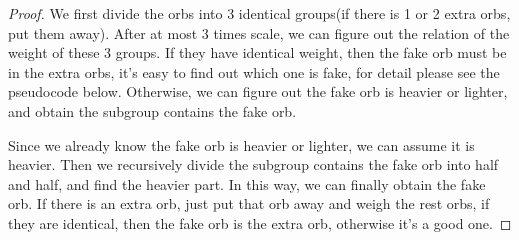 \documentclass[paper=a4, fontsize=11pt]{scrartcl} %
\numberwithin{equation}{section} %
\numberwithin{figure}{section} %
\numberwithin{table}{section} %
\newenvironment{myproof}{\begin{proof}\setlength{\parindent}{2em}}{\end{proof}}
\begin{document}
\begin{enumerate}
\begin{comment}
\ident In the following steps, it's just like a binary search, since in each recursion we exclude half of the samples, the algorithm need $log_2(n/3)+c $($c$ is a constant) operations, so the runtime is $O(\log n)$. 
\end{comment}
\begin{myproof}
We first divide the orbs into 3 identical groups(if there is 1 or 2 extra orbs, put them away). After at most 3 times scale, we can figure out the relation of the weight of these 3 groups.  If they have identical weight, then the fake orb must be in the extra orbs, it's easy to find out which one is fake, for detail please see the pseudocode below. Otherwise, we can figure out the fake orb is heavier or lighter, and obtain the subgroup contains the fake orb.

 Since we already know  the fake orb is heavier or lighter, we can assume it is heavier. Then we recursively divide the subgroup contains the fake orb into half and half, and find the heavier part. In this way, we can finally obtain the fake orb. If there is an extra orb, just put that orb away and weigh the rest orbs, if they are identical, then the fake orb is the extra orb, otherwise it's a good one.


\end{myproof}
\end{enumerate}
\end{document}
